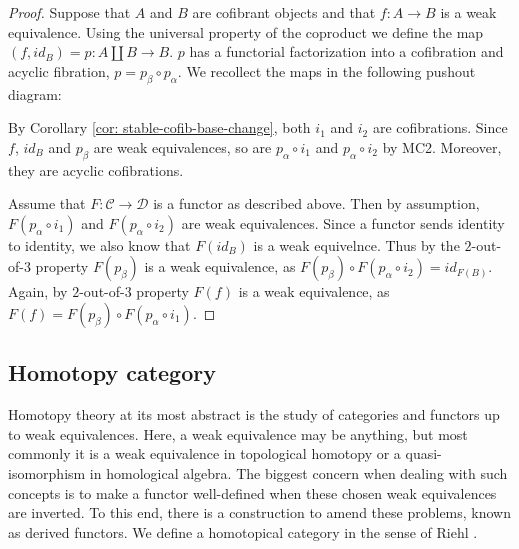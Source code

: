 \documentclass[../thesis.tex]{subfiles}
\begin{document}
            \begin{proof}
                Suppose that $A$ and $B$ are cofibrant objects and that $f:A\rightarrow B$ is a weak equivalence. Using the universal property of the coproduct we define the map $(f, id_B) = p: A\coprod B \rightarrow B$. $p$ has a functorial factorization into a cofibration and acyclic fibration, $p = p_\beta\circ p_\alpha$. We recollect the maps in the following pushout diagram:
                \begin{center}
                \end{center}
                By Corollary \ref{cor: stable-cofib-base-change}, both $i_1$ and $i_2$ are cofibrations. Since $f$, $id_B$ and $p_\beta$ are weak equivalences, so are $p_\alpha\circ i_1$ and $p_\alpha\circ i_2$ by MC2. Moreover, they are acyclic cofibrations.

                Assume that $F:\mathcal{C}\rightarrow\mathcal{D}$ is a functor as described above. Then by assumption, $F(p_\alpha\circ i_1)$ and $F(p_\alpha\circ i_2)$ are weak equivalences. Since a functor sends identity to identity, we also know that $F(id_B)$ is a weak equivelnce. Thus by the $2$-out-of-$3$ property $F(p_\beta)$ is a weak equivalence, as $F(p_\beta)\circ F(p_\alpha\circ i_2) = id_{F(B)}$. Again, by $2$-out-of-$3$ property $F(f)$ is a weak equivalence, as $F(f) = F(p_\beta)\circ F(p_\alpha\circ i_1)$.
            \end{proof}

        \subsection{Homotopy category}

            Homotopy theory at its most abstract is the study of categories and functors up to weak equivalences. Here, a weak equivalence may be anything, but most commonly it is a weak equivalence in topological homotopy or a quasi-isomorphism in homological algebra. The biggest concern when dealing with such concepts is to make a functor well-defined when these chosen weak equivalences are inverted. To this end, there is a construction to amend these problems, known as derived functors. We define a homotopical category in the sense of Riehl \cite{Riehl16}.
\end{document}
